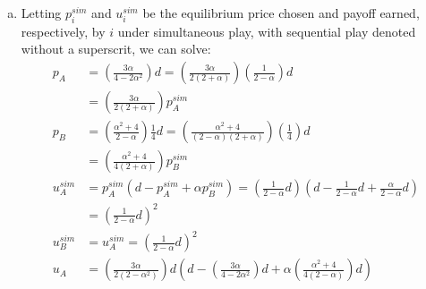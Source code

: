 \documentclass{article}
\begin{document}
\begin{enumerate}[(a)]
	
	\item Letting $p_i^{sim}$ and $u_i^{sim}$ be the equilibrium price chosen and payoff earned, respectively, by $i$ under simultaneous play, with sequential play denoted without a superscrit, we can solve:
		\begin{align*}
			p_A	&= \left(\frac{3\alpha}{4-2\alpha^2}\right)d = \left(\frac{3\alpha}{2(2+\alpha)}\right)\left(\frac{1}{2-\alpha}\right)d	\\
				&= \left(\frac{3\alpha}{2(2+\alpha)}\right)p_A^{sim}		\\
			p_B	&= \left(\frac{\alpha^2 + 4}{2-\alpha}\right)\frac{1}{4}d  = \left(\frac{\alpha^2 + 4}{(2-\alpha)(2+\alpha)}\right)\left(\frac{1}{4}\right)d	\\
				&= \left(\frac{\alpha^2+4}{4(2+\alpha)}\right)p_B^{sim}	\\
			u_A^{sim} 	&= p_A^{sim}\left(d-p_A^{sim} + \alpha p_B^{sim}\right) = \left(\frac{1}{2-\alpha}d\right)\left(d - \frac{1}{2-\alpha}d + \frac{\alpha}{2-\alpha}d\right)	\\
						&=  \left(\frac{1}{2-\alpha}d\right)^2	\\
			u_B^{sim} 	&= u_A^{sim} = \left(\frac{1}{2-\alpha}d\right)^2	\\
			u_A	&= \left(\frac{3\alpha}{2(2-\alpha^2)}\right)d\left(d-\left(\frac{3\alpha}{4-2\alpha^2}\right)d + \alpha \left(\frac{\alpha^2 + 4}{4(2-\alpha)}\right)d\right)
		\end{align*}
	
	
\end{enumerate}


\end{document}
